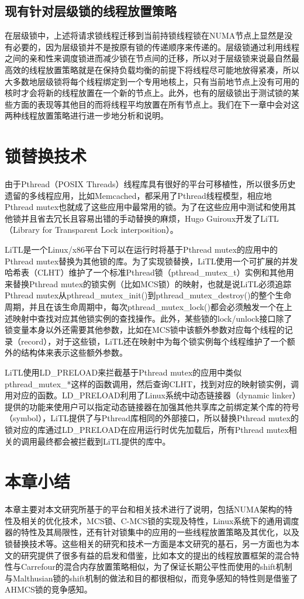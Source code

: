 \subsection{现有针对层级锁的线程放置策略}
在层级锁中，上述将请求锁线程迁移到当前持锁线程锁在NUMA节点上显然是没有必要的，因为层级锁并不是按原有锁的传递顺序来传递的。层级锁通过利用线程之间的亲和性来调度锁进而减少锁在节点间的迁移，所以对于层级锁来说最自然最高效的线程放置策略就是在保持负载均衡的前提下将线程尽可能地放得紧凑，所以大多数地层级锁将每个线程绑定到一个专用地核上，只有当前地节点上没有可用的核时才会将新的线程放置在一个新的节点上。此外，也有的层级锁出于测试锁的某些方面的表现等其他目的而将线程平均放置在所有节点上。我们在下一章中会对这两种线程放置策略进行进一步地分析和说明。

\section{锁替换技术}
由于Pthread（POSIX Threads）线程库具有很好的平台可移植性，所以很多历史遗留的多线程应用，比如Memcached，都采用了Pthread线程模型，相应地Pthread mutex也就成了这些应用中最常用的锁。为了在这些应用中测试和使用其他锁并且省去冗长且容易出错的手动替换的麻烦，Hugo Guiroux\cite{guiroux2016multicore}开发了LiTL（Library for Transparent Lock interposition）。

LiTL是一个Linux/x86平台下可以在运行时将基于Pthread mutex的应用中的Pthread mutex替换为其他锁的库。为了实现锁替换，LiTL使用一个可扩展的并发哈希表（CLHT\cite{david2015asynchronized}）维护了一个标准Pthread锁（pthread\_mutex\_t）实例和其他用来替换Pthread mutex的锁实例（比如MCS锁）的映射，也就是说LiTL必须追踪Pthread mutex从pthread\_mutex\_init()到pthread\_mutex\_destroy()的整个生命周期，并且在该生命周期中，每次pthread\_mutex\_lock()都会必须触发一个在上述映射中查找对应其他锁实例的查找操作。此外，某些锁的lock/unlock接口除了锁变量本身以外还需要其他参数，比如在MCS锁中该额外参数对应每个线程的记录（record），对于这些锁，LiTL还在映射中为每个锁实例每个线程维护了一个额外的结构体来表示这些额外参数。

LiTL使用LD\_PRELOAD来拦截基于Pthread mutex的应用中类似pthread\_mutex\_*这样的函数调用，然后查询CLHT，找到对应的映射锁实例，调用对应的函数。LD\_PRELOAD利用了Linux系统中动态链接器（dynamic linker）提供的功能来使用户可以指定动态链接器在加强其他共享库之前绑定某个库的符号（symbol），LiTL提供了与Pthread库相同的外部接口，所以替换Pthread mutex的锁对应的库通过LD\_PRELOAD在应用运行时优先加载后，所有Pthread mutex相关的调用最终都会被拦截到LiTL提供的库中。

\section{本章小结}
本章主要对本文研究所基于的平台和相关技术进行了说明，包括NUMA架构的特性及相关的优化技术，MCS锁、C-MCS锁的实现及特性，Linux系统下的通用调度器的特性及其局限性，还有针对锁集中的应用的一些线程放置策略及其优化，以及锁替换技术等。这些相关的研究和技术一方面是本文研究的基石，另一方面也为本文的研究提供了很多有益的启发和借鉴，比如本文的提出的线程放置框架的混合特性与Carrefour的混合内存放置策略相似，为了保证长期公平性而使用的shift机制与Malthusian锁的shift机制的做法和目的都很相似，而竞争感知的特性则是借鉴了AHMCS锁的竞争感知。